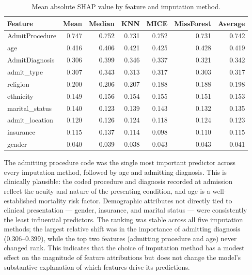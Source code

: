 \documentclass[12pt,a4paper]{report}
\begin{document}
\begin{table}[H]
\centering
\caption{Mean absolute SHAP value by feature and imputation method.}
\label{tab:shap-stability}
\small
\begin{tabular}{lrrrrrr}
\toprule
Feature & Mean & Median & KNN & MICE & MissForest & Average \\
\midrule
AdmitProcedure & 0.747 & 0.752 & 0.731 & 0.752 & 0.731 & 0.742 \\
age & 0.416 & 0.406 & 0.421 & 0.425 & 0.428 & 0.419 \\
AdmitDiagnosis & 0.306 & 0.399 & 0.346 & 0.337 & 0.321 & 0.342 \\
admit\_type & 0.307 & 0.343 & 0.313 & 0.317 & 0.303 & 0.317 \\
religion & 0.200 & 0.206 & 0.207 & 0.188 & 0.188 & 0.198 \\
ethnicity & 0.149 & 0.156 & 0.154 & 0.155 & 0.151 & 0.153 \\
marital\_status & 0.140 & 0.123 & 0.139 & 0.143 & 0.132 & 0.135 \\
admit\_location & 0.120 & 0.126 & 0.124 & 0.118 & 0.124 & 0.123 \\
insurance & 0.115 & 0.137 & 0.114 & 0.098 & 0.110 & 0.115 \\
gender & 0.040 & 0.039 & 0.038 & 0.043 & 0.043 & 0.041 \\
\bottomrule
\end{tabular}
\end{table}


The admitting procedure code was the single most important predictor across every imputation method, followed by age and admitting diagnosis. This is clinically plausible: the coded procedure and diagnosis recorded at admission reflect the acuity and nature of the presenting condition, and age is a well-established mortality risk factor. Demographic attributes not directly tied to clinical presentation --- gender, insurance, and marital status --- were consistently the least influential predictors. The ranking was stable across all five imputation methods; the largest relative shift was in the importance of admitting diagnosis (0.306--0.399), while the top two features (admitting procedure and age) never changed rank. This indicates that the choice of imputation method has a modest effect on the magnitude of feature attributions but does not change the model's substantive explanation of which features drive its predictions.
\end{document}
